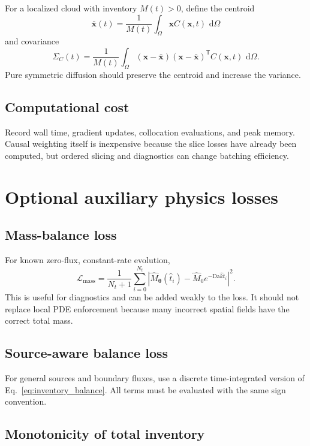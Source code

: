 \documentclass[11pt]{article}
\newcommand{\thetav}{\bm{\theta}}
\newcommand{\xv}{\bm{x}}
\newcommand{\Lmass}{\mathcal{L}_{\mathrm{mass}}}
\newcommand{\Om}{\Omega}
\newcommand{\Da}{\mathrm{Da}}
\providecommand{\dd}{\,\mathrm{d}}
\begin{document}
For a localized cloud with inventory $M(t)>0$, define the centroid
\begin{equation}
\bar{\xv}(t)
=
\frac{1}{M(t)}
\int_{\Om}\xv C(\xv,t)\,\dd\Om
\end{equation}
and covariance
\begin{equation}
\Sigma_C(t)
=
\frac{1}{M(t)}
\int_{\Om}
(\xv-\bar{\xv})
(\xv-\bar{\xv})^{\mathsf T}
C(\xv,t)\,\dd\Om.
\end{equation}
Pure symmetric diffusion should preserve the centroid and increase the variance.

\subsection{Computational cost}

Record wall time, gradient updates, collocation evaluations, and peak memory. Causal weighting itself is inexpensive because the slice losses have already been computed, but ordered slicing and diagnostics can change batching efficiency.

\section{Optional auxiliary physics losses}

\subsection{Mass-balance loss}

For known zero-flux, constant-rate evolution,
\begin{equation}
\Lmass
=
\frac{1}{N_t+1}
\sum_{i=0}^{N_t}
\left|
\widehat{M}_{\thetav}(\hat{t}_i)
-\widehat{M}_0e^{-\Da\hat{k}\hat{t}_i}
\right|^2.
\end{equation}
This is useful for diagnostics and can be added weakly to the loss. It should not replace local PDE enforcement because many incorrect spatial fields have the correct total mass.

\subsection{Source-aware balance loss}

For general sources and boundary fluxes, use a discrete time-integrated version of Eq.~\eqref{eq:inventory_balance}. All terms must be evaluated with the same sign convention.

\subsection{Monotonicity of total inventory}
\end{document}

